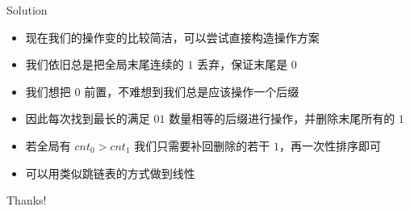 ﻿\documentclass[aspectratio=169,handout]{ctexbeamer}
\begin{document}
\begin{frame}{Solution}
    \begin{itemize}
        \item 现在我们的操作变的比较简洁，可以尝试直接构造操作方案
        \item 我们依旧总是把全局末尾连续的 $ 1 $ 丢弃，保证末尾是 $ 0 $
        \item 我们想把 $ 0 $ 前置，不难想到我们总是应该操作一个后缀
        \item 因此每次找到最长的满足 $01$ 数量相等的后缀进行操作，并删除末尾所有的 $ 1 $
        \item 若全局有 $cnt_0> cnt_1$ 我们只需要补回删除的若干 $ 1 $，再一次性排序即可
        \item 可以用类似跳链表的方式做到线性
    \end{itemize}
\end{frame}



\begin{frame}
    \begin{center}
        {\Huge\calligra Thanks!}
    \end{center}
\end{frame}
\end{document}

